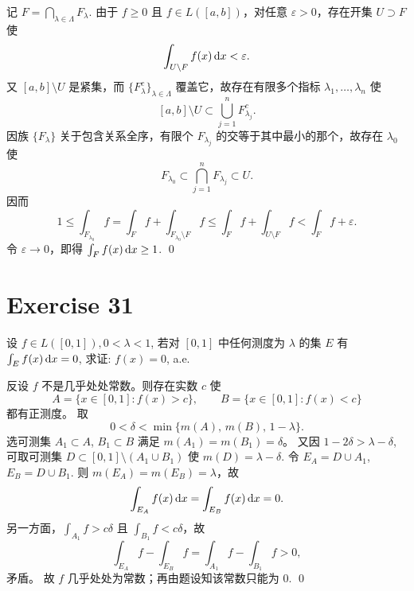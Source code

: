 \documentclass{article}
\begin{document}
\begin{solution}
  记 $F = \bigcap_{\lambda \in \Lambda} F_\lambda$. 由于 $f \ge 0$ 且 $f \in L([a,b])$，对任意 $\varepsilon > 0$，存在开集 $U \supset F$ 使
  \[
    \int_{U \setminus F} f(x)\,\mathrm{d} x < \varepsilon.
  \]
  又 $[a,b] \setminus U$ 是紧集，而 $\{F_\lambda^c\}_{\lambda\in\Lambda}$ 覆盖它，故存在有限多个指标 $\lambda_1,\dots,\lambda_n$ 使
  \[
    [a,b] \setminus U \subset \bigcup_{j=1}^n F_{\lambda_j}^c.
  \]
  因族 $\{F_\lambda\}$ 关于包含关系全序，有限个 $F_{\lambda_j}$ 的交等于其中最小的那个，故存在 $\lambda_0$ 使
  \[
    F_{\lambda_0} \subset \bigcap_{j=1}^n F_{\lambda_j} \subset U.
  \]
  因而
  \[
    1 \le \int_{F_{\lambda_0}} f
      = \int_F f + \int_{F_{\lambda_0} \setminus F} f
      \le \int_F f + \int_{U \setminus F} f
      < \int_F f + \varepsilon.
  \]
  令 $\varepsilon \to 0$，即得 $\int_F f(x)\,\mathrm{d} x \ge 1$. \qed
\end{solution}

\section{Exercise 31}

设 $f \in L([0, 1]), 0 < \lambda < 1$, 若对 $[0, 1]$ 中任何测度为 $\lambda$ 的集 $E$ 有 $\int_E f(x)\,\mathrm{d} x = 0$, 求证: $f(x) = 0$, a.e.

\begin{solution}
  反设 $f$ 不是几乎处处常数。则存在实数 $c$ 使
  \[
    A = \{x \in [0,1] : f(x) > c\}, \qquad B = \{x \in [0,1] : f(x) < c\}
  \]
  都有正测度。
  取
  \[
    0 < \delta < \min\{m(A),\, m(B),\, 1-\lambda\}.
  \]
  选可测集 $A_1 \subset A$, $B_1 \subset B$ 满足 $m(A_1) = m(B_1) = \delta$。
  又因 $1 - 2\delta > \lambda - \delta$, 可取可测集 $D \subset [0,1] \setminus (A_1 \cup B_1)$ 使 $m(D) = \lambda - \delta$.
  令 $E_A = D \cup A_1$, $E_B = D \cup B_1$. 则 $m(E_A) = m(E_B) = \lambda$，故
  \[
    \int_{E_A} f(x)\,\mathrm{d} x = \int_{E_B} f(x)\,\mathrm{d} x = 0.
  \]
  另一方面，$\int_{A_1} f > c\delta$ 且 $\int_{B_1} f < c\delta$，故
  \[
    \int_{E_A} f - \int_{E_B} f = \int_{A_1} f - \int_{B_1} f > 0,
  \]
  矛盾。
  故 $f$ 几乎处处为常数；再由题设知该常数只能为 $0$. \qed
\end{solution}

\end{document}

